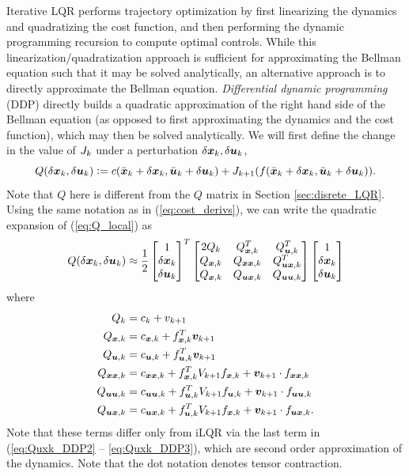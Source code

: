 Iterative LQR performs trajectory optimization by first linearizing the dynamics and quadratizing the cost function, and then performing the dynamic programming recursion to compute optimal controls. While this linearization/quadratization approach is sufficient for approximating the Bellman equation such that it may be solved analytically, an alternative approach is to directly approximate the Bellman equation. \textit{Differential dynamic programming} (DDP) directly builds a quadratic approximation of the right hand side of the Bellman equation (as opposed to first approximating the dynamics and the cost function), which may then be solved analytically. 
We will first define the change in the value of $J_k$ under a perturbation $\delta \bm{x}_k, \delta \bm{u}_k$,
\begin{equation}
    \label{eq:Q_local}
    Q(\delta \bm{x}_k, \delta \bm{u}_k) \vcentcolon= c (\bar{\bm{x}}_k + \delta \bm{x}_k, \bar{\bm{u}}_k + \delta \bm{u}_k) + J_{k+1}(f(\bar{\bm{x}}_k + \delta \bm{x}_k, \bar{\bm{u}}_k + \delta \bm{u}_k)).
\end{equation}
Note that $Q$ here is different from the $Q$ matrix in Section \ref{sec:disrete_LQR}. Using the same notation as in (\ref{eq:cost_derivs}), we can write the quadratic expansion of (\ref{eq:Q_local}) as
\begin{equation}
    Q(\delta \bm{x}_k, \delta \bm{u}_k) \approx 
\frac{1}{2}
    \begin{bmatrix}
    1\\
    \delta \bm{x}_k\\
    \delta \bm{u}_k
\end{bmatrix}^T
    \begin{bmatrix}
    2 Q_k & Q_{\bm{x},k}^T & Q_{\bm{u},k}^T\\
    Q_{\bm{x},k} & Q_{\bm{x} \bm{x},k} & Q_{\bm{u} \bm{x},k}^T\\
    Q_{\bm{x},k} & Q_{\bm{u} \bm{x},k} & Q_{\bm{u} \bm{u},k}
\end{bmatrix}
    \begin{bmatrix}
    1\\
    \delta \bm{x}_k\\
    \delta \bm{u}_k
\end{bmatrix}
\end{equation}
where
\begin{align}
    \label{eq:Quxk_DDP1}
    Q_k &= c_k + v_{k+1}\\
    Q_{\bm{x},k} &= c_{\bm{x},k} + f_{\bm{x},k}^T \bm{v}_{k+1}\\
    Q_{\bm{u},k} &= c_{\bm{u},k} + f_{\bm{u},k}^T \bm{v}_{k+1}\\
    Q_{\bm{x} \bm{x},k} &= c_{\bm{x} \bm{x},k} + f_{\bm{x},k}^T V_{k+1} f_{\bm{x},k} + \bm{v}_{k+1} \cdot f_{\bm{x}\bm{x},k} \label{eq:Quxk_DDP2}\\
    Q_{\bm{u} \bm{u},k} &= c_{\bm{u} \bm{u},k} + f_{\bm{u},k}^T V_{k+1} f_{\bm{u},k} + \bm{v}_{k+1} \cdot f_{\bm{u}\bm{u},k}\\
    Q_{\bm{u} \bm{x},k} &= c_{\bm{u} \bm{x},k} + f_{\bm{u},k}^T V_{k+1} f_{\bm{x},k} + \bm{v}_{k+1} \cdot f_{\bm{u}\bm{x},k}. \label{eq:Quxk_DDP3}
\end{align}
Note that these terms differ only from iLQR via the last term in (\ref{eq:Quxk_DDP2} -- \ref{eq:Quxk_DDP3}), which are second order approximation of the dynamics. Note that the dot notation denotes tensor contraction.

